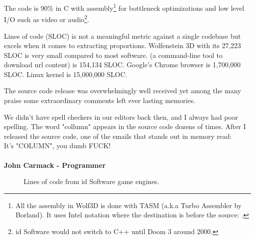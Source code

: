 \documentclass[book.tex]{subfiles}
\begin{document}
\par
 The code is 90\% in C with assembly\footnote{All the assembly in Wolf3D is done with TASM (a.k.a Turbo Assembler by Borland). It uses Intel notation where the destination is before the source:   .} for bottleneck optimizations and low level I/O such as video or audio\footnote{id Software would not switch to C++ until Doom 3 around 2000.}.\\
 \par
   Lines of code (SLOC) is not a meaningful metric against a single codebase but excels when it comes to extracting proportions. Wolfenstein 3D with its 27,223 SLOC is very small compared to most software.  (a command-line tool to download url content) is 154,134 SLOC. Google's Chrome browser is 1,700,000 SLOC. Linux kernel is 15,000,000 SLOC.\\
\par
The source code release was overwhelmingly well received yet among the many praise some extraordinary comments left ever lasting memories.\\
\par
 \begin{fancyquotes}
   We didn't have spell checkers in our editors back then, and I always had poor spelling.  The word "collumn" appears in the source code dozens of times.  After I released the source code, one of the emails that stands out in memory read:
 \bigskip \\
It's "COLUMN", you dumb FUCK!\\
 \bigskip \\
\textbf{John Carmack - Programmer}
 \end{fancyquotes}
 \par
\begin{figure}[H]
\centering
   \caption{Lines of code from id Software game engines.}
 \end{figure}
 
\end{document}
